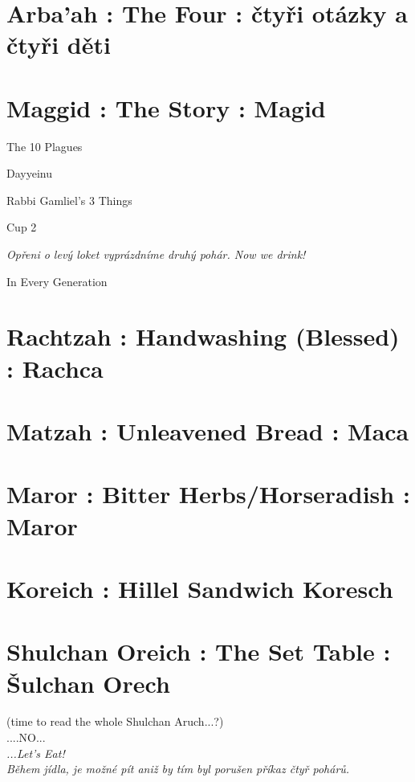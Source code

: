 \documentclass[a5paper,10pt]{memoir}
\begin{document}
\section{Arba'ah : The Four : čtyři otázky a čtyři děti}
\MaNishtana
\FourChildrenText
%
\section{Maggid : The Story : Magid}
\MaggidIntro
\onecolumn
\begin{center}
	\noindent \LARGE \color{midblue} The 10 Plagues \centering
\end{center}
\Plagues
\onecolumn
\begin{center}
	\noindent \LARGE \color{midblue} Dayyeinu
\end{center}
\Dayyeinu
\begin{center}
	\noindent \LARGE \color{midblue} Rabbi Gamliel's 3 Things
\end{center}
\Gamliel
\begin{center}
	\noindent \LARGE \color{midblue} Cup 2
\end{center}
\Kaddeish
\textit{Opřeni o levý loket vyprázdníme druhý pohár. \color{midblue}Now we drink!}
\onecolumn
\begin{center}
	\noindent \LARGE \color{midblue} In Every Generation
	\end{center}
\EveryGenerationText

\section{Rachtzah : Handwashing (Blessed) : Rachca}
\NetilatYadayim
\raggedright 

\section{Matzah : Unleavened Bread : Maca}
\HaMotzi
\Matzah

\section{Maror : Bitter Herbs/Horseradish : Maror}
\Maror

\section{Koreich : Hillel Sandwich Koresch}
\Koreich

\section{Shulchan Oreich : The Set Table : Šulchan Orech}
\color{midblue} (time to read the whole Shulchan Aruch...?)\\
\centering ....NO... \\ 
\hspace*{5mm} \textit{{\raggedleft ...Let's Eat!} \\ \color{black} Během jídla, je možné  pít aniž by tím byl porušen příkaz čtyř pohárů.}
\end{document}

